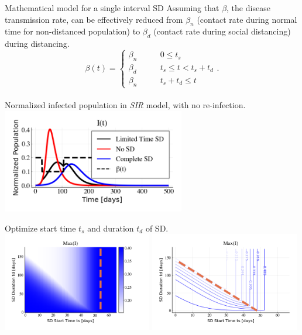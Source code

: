 \documentclass[10pt]{beamer}
\begin{document}
\begin{frame}{Mathematical model for a single interval SD}
	Assuming that $\beta$, the disease transmission rate, can be effectively reduced from $\beta_{n}$ (contact rate during normal time for non-distanced population) to $\beta_{d}$ (contact rate during social distancing) during distancing. \\ \vspace{0.5cm}
	\begin{equation} \label{eq:beta}
		\beta(t) = \left\{
		\begin{matrix} 
			\beta_n & \qquad 0 \leq t_s \\ 
			\beta_d & \qquad t_s \leq t < t_s+t_d \\
			\beta_n  & \qquad t_s+t_d \leq t 
		\end{matrix}
		\right. .
	\end{equation} \\ \vspace{0.5cm}
	Normalized infected population in \textit{SIR} model, with no re-infection. \\
	\hspace{2cm} \includegraphics[width=0.6\textwidth]{epidemic-sd.png}\\
\end{frame}

\begin{frame}{Optimize start time $t_s$ and duration $t_d$ of SD.}
	\includegraphics[width=0.49\textwidth]{epidemic-sir-heatmap.png}
	\includegraphics[width=0.49\textwidth]{epidemic-sir-contour.png} \\

\end{frame}
\end{document}
